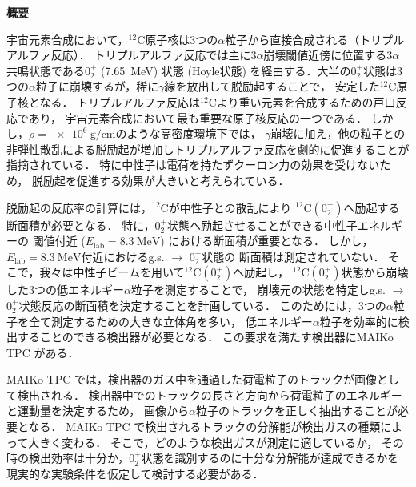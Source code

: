\documentclass[./master]{subfiles}
\begin{document}
\mbox{}

\begin{center}\LARGE\textbf{概要}\end{center}
\vspace{\baselineskip}

  宇宙元素合成において，${}^{12}\mathrm{C}$原子核は3つの$\alpha$粒子から直接合成される（トリプルアルファ反応）．
  トリプルアルファ反応では主に3$\alpha$崩壊閾値近傍に位置する3$\alpha$共鳴状態である$0_2^+$ (\SI{7.65}{\mega\electronvolt})
  状態 (Hoyle状態) を経由する．大半の$0_2^+$状態は3つの$\alpha$粒子に崩壊するが，稀に$\gamma$線を放出して脱励起することで，
  安定した${}^{12}\mathrm{C}$原子核となる．
  トリプルアルファ反応は${}^{12}\mathrm{C}$より重い元素を合成するための戸口反応であり，
  宇宙元素合成において最も重要な原子核反応の一つである．
  しかし，$\rho = \SI{e6}{\gram\per\centi\metre}$のような高密度環境下では，
  $\gamma$崩壊に加え，他の粒子との非弾性散乱による脱励起が増加しトリプルアルファ反応を劇的に促進することが指摘されている．
  特に中性子は電荷を持たずクーロン力の効果を受けないため，
  脱励起を促進する効果が大きいと考えられている．

  脱励起の反応率の計算には，${}^{12}\mathrm{C}$が中性子との散乱により
  ${}^{12}\mathrm{C} (0_2^+)$へ励起する断面積が必要となる．
  特に，$0_2^+$状態へ励起させることができる中性子エネルギーの
  閾値付近 ($E_{\text{lab}} = \SI{8.3}{\mega\electronvolt}$) における断面積が重要となる．
  しかし，$E_{\text{lab}} = \SI{8.3}{\mega\electronvolt}$付近におけるg.s. $\rightarrow$ $0_2^+$状態の
  断面積は測定されていない．
  そこで，我々は中性子ビームを用いて${}^{12}\mathrm{C} (0_2^+)$へ励起し，
  ${}^{12}\mathrm{C} (0_2^+)$状態から崩壊した3つの低エネルギー$\alpha$粒子を測定することで，
  崩壊元の状態を特定しg.s. $\rightarrow$ $0_2^+$状態反応の断面積を決定することを計画している．
  このためには，3つの$\alpha$粒子を全て測定するための大きな立体角を多い，
  低エネルギー$\alpha$粒子を効率的に検出することのできる検出器が必要となる．
  この要求を満たす検出器にMAIKo TPC がある．

  MAIKo TPC では，検出器のガス中を通過した荷電粒子のトラックが画像として検出される．
  検出器中でのトラックの長さと方向から荷電粒子のエネルギーと運動量を決定するため，
  画像から$\alpha$粒子のトラックを正しく抽出することが必要となる．
  MAIKo TPC で検出されるトラックの分解能が検出ガスの種類によって大きく変わる．
  そこで，どのような検出ガスが測定に適しているか，
  その時の検出効率は十分か，$0_2^+$状態を識別するのに十分な分解能が達成できるかを
  現実的な実験条件を仮定して検討する必要がある．
\end{document}
